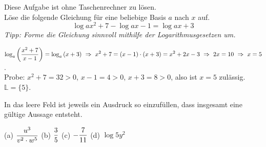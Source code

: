 \documentclass[11pt]{exam}
\begin{document}
\begin{questions}
 Diese Aufgabe ist ohne Taschenrechner zu lösen.\\
Löse die folgende Gleichung für eine beliebige Basis $a$ nach $x$ auf. \[\log{a}{x^2+7}-\log{a}{x-1}=\log{a}{x+3}\] {\textit{Tipp: Forme die Gleichung sinnvoll mithilfe der Logarithmusgesetzen um.}}
{\begin{solution}
		$\ds\log{a}{\frac{x^2+7}{x-1}}=\log{a}{x+3}\ \Rightarrow\ x^2+7=(x-1)\*(x+3)=x^2+2x-3\ \Rightarrow\ 2x=10\ \Rightarrow\ x=5$.\\
		Probe: $x^2+7=32>0$, $x-1=4>0$, $x+3=8>0$, also ist $x=5$ zulässig. $\mathbb{L}=\{5\}$.
\end{solution}}
{}

\question[4]
In das leere Feld ist jeweils ein Ausdruck so einzufüllen, dass insgesamt eine gültige Aussage entsteht.
{\begin{solution}
		(a) $\displaystyle\frac{u^3}{v^2\cdot w^5}$ \qquad (b) $\displaystyle\frac{3}{5}$ \qquad (c) $\displaystyle-\frac{7}{11}$ \qquad (d) $\log{5}{y^2}$
\end{solution}}
{}

\end{questions}
\end{document}
